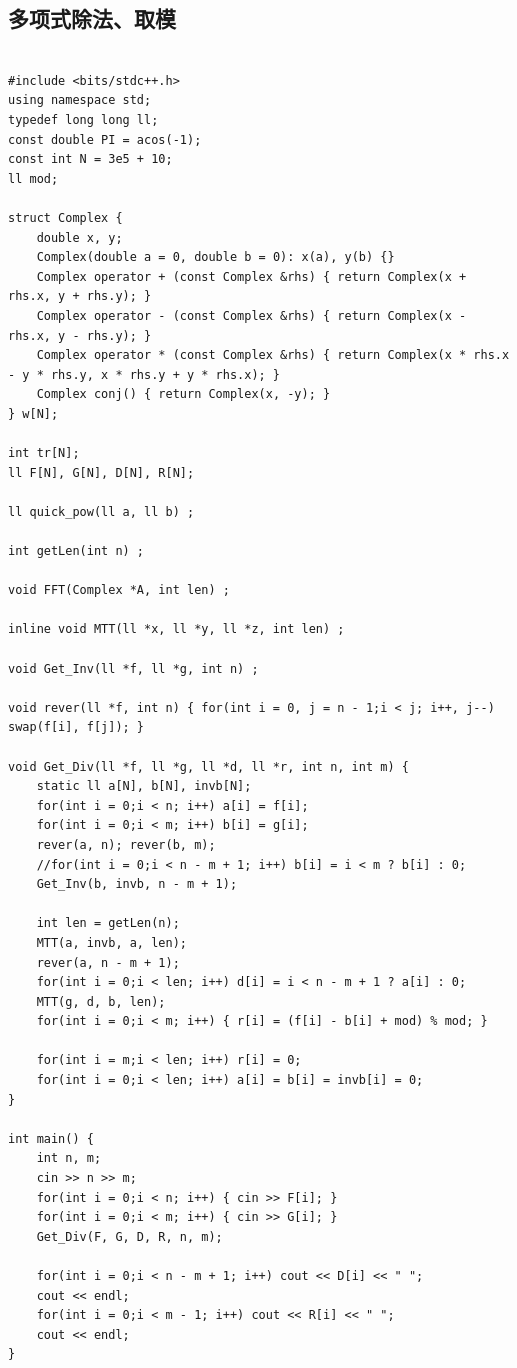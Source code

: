 \documentclass[twoside]{article}
\begin{document}
\subsection{多项式除法、取模}
\begin{lstlisting}

#include <bits/stdc++.h>
using namespace std;
typedef long long ll;
const double PI = acos(-1);
const int N = 3e5 + 10;
ll mod;

struct Complex {
    double x, y;
    Complex(double a = 0, double b = 0): x(a), y(b) {}
    Complex operator + (const Complex &rhs) { return Complex(x + rhs.x, y + rhs.y); }
    Complex operator - (const Complex &rhs) { return Complex(x - rhs.x, y - rhs.y); }
    Complex operator * (const Complex &rhs) { return Complex(x * rhs.x - y * rhs.y, x * rhs.y + y * rhs.x); }
    Complex conj() { return Complex(x, -y); }
} w[N];

int tr[N];
ll F[N], G[N], D[N], R[N];

ll quick_pow(ll a, ll b) ;

int getLen(int n) ;

void FFT(Complex *A, int len) ;

inline void MTT(ll *x, ll *y, ll *z, int len) ;

void Get_Inv(ll *f, ll *g, int n) ;

void rever(ll *f, int n) { for(int i = 0, j = n - 1;i < j; i++, j--) swap(f[i], f[j]); }

void Get_Div(ll *f, ll *g, ll *d, ll *r, int n, int m) {
    static ll a[N], b[N], invb[N];
    for(int i = 0;i < n; i++) a[i] = f[i];
    for(int i = 0;i < m; i++) b[i] = g[i];
    rever(a, n); rever(b, m);
    //for(int i = 0;i < n - m + 1; i++) b[i] = i < m ? b[i] : 0;
    Get_Inv(b, invb, n - m + 1);

    int len = getLen(n);
    MTT(a, invb, a, len);
    rever(a, n - m + 1);
    for(int i = 0;i < len; i++) d[i] = i < n - m + 1 ? a[i] : 0;
    MTT(g, d, b, len);
    for(int i = 0;i < m; i++) { r[i] = (f[i] - b[i] + mod) % mod; }

    for(int i = m;i < len; i++) r[i] = 0;
    for(int i = 0;i < len; i++) a[i] = b[i] = invb[i] = 0;
}

int main() {
    int n, m;
    cin >> n >> m;
    for(int i = 0;i < n; i++) { cin >> F[i]; }
    for(int i = 0;i < m; i++) { cin >> G[i]; }
    Get_Div(F, G, D, R, n, m);

    for(int i = 0;i < n - m + 1; i++) cout << D[i] << " ";
    cout << endl;
    for(int i = 0;i < m - 1; i++) cout << R[i] << " ";
    cout << endl;
}
\end{lstlisting}
\end{document}

